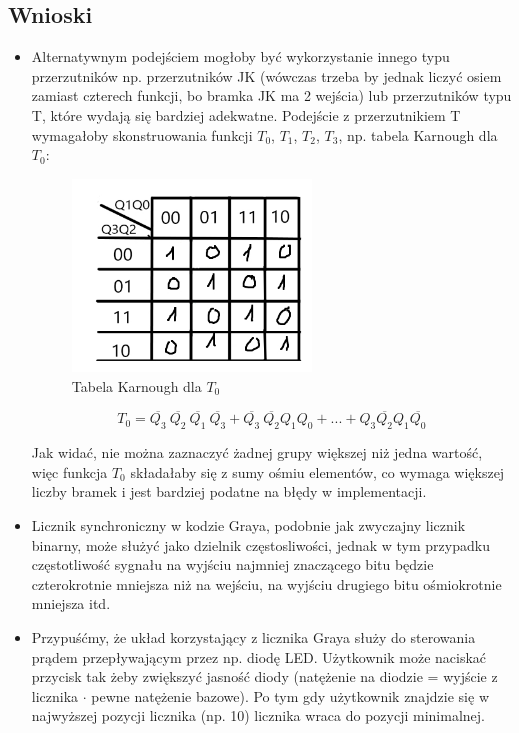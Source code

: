 \documentclass{article}
\begin{document}
\subsection{Wnioski}
\begin{itemize}
    \item
    Alternatywnym podejściem mogłoby być wykorzystanie innego typu przerzutników np. przerzutników JK (wówczas trzeba by jednak
    liczyć osiem zamiast czterech funkcji, bo bramka JK ma 2 wejścia) lub przerzutników typu T, które wydają się bardziej adekwatne.
    Podejście z przerzutnikiem T wymagałoby skonstruowania funkcji $T_0$, $T_1$, $T_2$, $T_3$, np. tabela Karnough dla $T_0$:

    \begin{figure}[H]
        \centering
        \includegraphics[width=0.6\textwidth]{3b_alt.jpg}
        \caption{Tabela Karnough dla $T_0$}
    \end{figure}

    $$T_0 = \overline{Q_3}\:\overline{Q_2}\:\overline{Q_1}\:\overline{Q_3} + \overline{Q_3}\:\overline{Q_2}Q_1Q_0 + ... + 
    Q_3\overline{Q_2}Q_1\overline{Q_0}$$

    Jak widać, nie można zaznaczyć żadnej grupy większej niż jedna wartość, więc funkcja $T_0$ składałaby się z sumy ośmiu elementów,
    co wymaga większej liczby bramek i jest bardziej podatne na błędy w implementacji.

    \item
    Licznik synchroniczny w kodzie Graya, podobnie jak zwyczajny licznik binarny, może służyć jako dzielnik częstosliwości,
    jednak w tym przypadku częstotliwość sygnału na wyjściu najmniej znaczącego bitu będzie czterokrotnie mniejsza niż na wejściu,
    na wyjściu drugiego bitu ośmiokrotnie mniejsza itd.
    \item
    Przypuśćmy, że układ korzystający z licznika Graya służy do sterowania prądem przepływającym przez np. diodę LED. Użytkownik
    może naciskać przycisk tak żeby zwiększyć jasność diody (natężenie na diodzie = wyjście z licznika $\cdot$ pewne natężenie bazowe).
    Po tym gdy użytkownik znajdzie się w najwyższej pozycji licznika (np. 10) licznika wraca do pozycji minimalnej.


\end{itemize}
\end{document}
